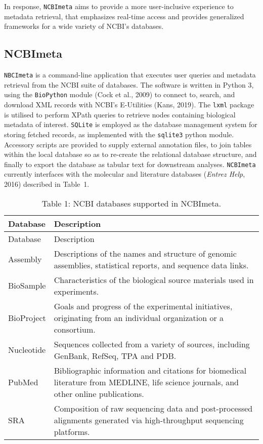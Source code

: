 \documentclass[
]{article}
\begin{document}
In response, \texttt{NCBImeta} aims to provide a more user-inclusive
experience to metadata retrieval, that emphasizes real-time access and
provides generalized frameworks for a wide variety of NCBI's databases.

\hypertarget{sec:ncbimeta}{%
\subsection{NCBImeta}\label{sec:ncbimeta}}

\texttt{NBCImeta} is a command-line application that executes user
queries and metadata retrieval from the NCBI suite of databases. The
software is written in Python 3, using the \texttt{BioPython} module
(Cock et al., 2009) to connect to, search, and download XML records with
NCBI's E-Utilities (Kans, 2019). The \texttt{lxml} package is utilised
to perform XPath queries to retrieve nodes containing biological
metadata of interest. \texttt{SQLite} is employed as the database
management system for storing fetched records, as implemented with the
\texttt{sqlite3} python module. Accessory scripts are provided to supply
external annotation files, to join tables within the local database so
as to re-create the relational database structure, and finally to export
the database as tabular text for downstream analyses. \texttt{NCBImeta}
currently interfaces with the molecular and literature databases
(\emph{Entrez Help}, 2016) described in Table~1.

\begin{longtable}[]{@{}
  >{\raggedright\arraybackslash}p{}
  >{\raggedright\arraybackslash}p{}@{}}
\caption{Table 1: NCBI databases supported in NCBImeta.}\tabularnewline
\toprule
Database & Description \\
\midrule
\endfirsthead
\toprule
Database & Description \\
\midrule
\endhead
Assembly & Descriptions of the names and structure of genomic
assemblies, statistical reports, and sequence data links. \\
BioSample & Characteristics of the biological source materials used in
experiments. \\
BioProject & Goals and progress of the experimental initiatives,
originating from an individual organization or a consortium. \\
Nucleotide & Sequences collected from a variety of sources, including
GenBank, RefSeq, TPA and PDB. \\
PubMed & Bibliographic information and citations for biomedical
literature from MEDLINE, life science journals, and other online
publications. \\
SRA & Composition of raw sequencing data and post-processed alignments
generated via high-throughput sequencing platforms. \\
\bottomrule
\end{longtable}
\end{document}
